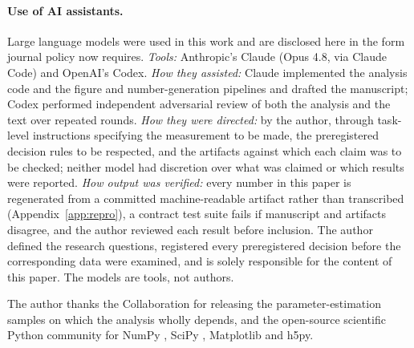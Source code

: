 \documentclass[aps,prd,twocolumn,amsmath,amssymb,nofootinbib,superscriptaddress]{revtex4-2}
\begin{document}
\paragraph{Use of AI assistants.} Large language models were used in this work and are disclosed here
in the form journal policy now requires. \emph{Tools:} Anthropic's Claude (Opus 4.8, via Claude Code) and
OpenAI's Codex. \emph{How they assisted:} Claude implemented the analysis code and the figure and
number-generation pipelines and drafted the manuscript; Codex performed independent adversarial review of
both the analysis and the text over repeated rounds. \emph{How they were directed:} by the author, through
task-level instructions specifying the measurement to be made, the preregistered decision rules to be
respected, and the artifacts against which each claim was to be checked; neither model had discretion over
what was claimed or which results were reported. \emph{How output was verified:} every number in this
paper is regenerated from a committed machine-readable artifact rather than transcribed
(Appendix~\ref{app:repro}), a contract test suite fails if manuscript and artifacts disagree, and the
author reviewed each result before inclusion. The author defined the research questions, registered every
preregistered decision before the corresponding data were examined, and is
solely responsible for the content of this paper. The models are tools, not authors.

The author thanks the Collaboration for releasing the
parameter-estimation samples on which the analysis wholly depends, and the open-source scientific Python
community for NumPy \citep{numpy}, SciPy \citep{scipy}, Matplotlib \citep{matplotlib} and h5py.
\end{document}
